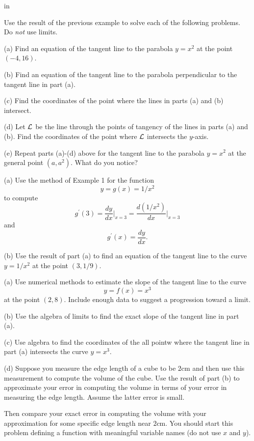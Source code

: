 \documentclass{ximera}
\newcommand{\pskip}{\vskip 0.1 in}
\begin{document}
\pskip

\begin{question} \label{Ex:3245trg}
Use the result of the previous example to solve each of the following problems. Do \emph{not} use limits.

(a) Find an equation of the tangent line to the parabola $y=x^2$ at the point $(-4,16)$.

(b) Find an equation of the tangent line to the parabola perpendicular to the tangent line in part (a).

(c) Find the coordinates of the point where the lines in parts (a) and (b) intersect.

(d) Let ${\cal L}$ be the line through the points of tangency of the lines in parts (a) and (b). Find the coordinates of the point where ${\cal L}$ intersects the $y$-axis.

(e) Repeat parts (a)-(d) above for the tangent line to the parabola $y=x^2$ at the general point $(a,a^2)$. What do you notice?

\end{question}

\begin{question}   \label{Ex:3ereftg4t}
(a) Use the method of Example 1 for the function
\[
   y = g(x) = 1/x^2
\]
to compute 
\[
    g^\prime(3) =   \frac{dy}{dx}\Big|_{x=3} = \frac{d(1/x^2)}{dx}\Big|_{x=3} 
\]
and
\[
     g^\prime(x) = \frac{dy}{dx} .
\]


(b) Use the result of part (a) to find an equation of the tangent line to the curve $y=1/x^2$ at the point $(3,1/9)$.
\end{question}


\begin{question}  \label{Q4324}
(a) Use numerical methods to estimate the slope of the tangent line to the curve
\[
     y = f(x) = x^3
\]
at the point $(2,8)$. Include enough data to suggest a progression toward a limit.

(b) Use the algebra of limits to find the exact slope of the tangent line in part (a).

(c) Use algebra to find the coordinates of the all pointw where the tangent line in part (a) intersects the curve $y=x^3$.

(d) Suppose you measure the edge length of a cube to be $2$cm and then use this measurement to compute the volume of the cube. Use the result of part (b) to approximate your error in computing the volume in terms of your error in measuring the edge length. Assume the latter error is small. 

Then compare your exact error in computing the volume with your approximation for some specific edge length near $2$cm. You should start this problem defining a function with meaningful variable names (do not use $x$ and $y$).

\end{question}
\end{document}
